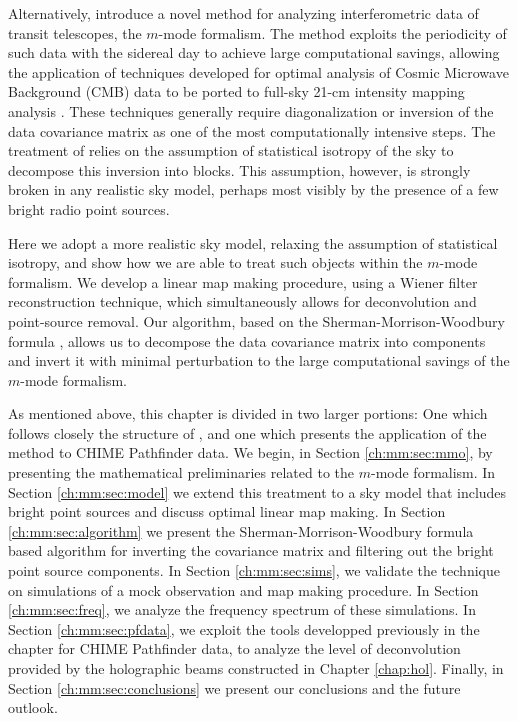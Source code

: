 Alternatively, \cite{mmodes1, mmodes2} introduce a novel method for analyzing interferometric data of transit telescopes, the $m$-mode formalism. The method exploits the periodicity of such data with the sidereal day to achieve large computational savings, allowing the application of techniques developed for optimal analysis of Cosmic Microwave Background (CMB) data \citep{bondjaffeknox, tegmark, myerscbi} to be ported to full-sky 21-cm intensity mapping analysis \citep{liutegmark}. These techniques generally require diagonalization or inversion of the data covariance matrix as one of the most computationally intensive steps. The treatment of \cite{mmodes1, mmodes2} relies on the assumption of statistical isotropy of the sky to decompose this inversion into blocks. This assumption, however, is strongly broken in any realistic sky model, perhaps most visibly by the presence of a few bright radio point sources.

Here we adopt a more realistic sky model, relaxing the assumption of statistical isotropy, and show how we are able to treat such objects within the $m$-mode formalism. We develop a linear map making procedure, using a Wiener filter reconstruction technique, which simultaneously allows for deconvolution and point-source removal. Our algorithm, based on the Sherman-Morrison-Woodbury formula \citep{smf1, smf2, woodbury}, allows us to decompose the data covariance matrix into components and invert it with minimal perturbation to the large computational savings of the $m$-mode formalism.

As mentioned above, this chapter is divided in two larger portions: One which follows closely the structure of \citep{bergeroppermann}, and one which presents the application of the method to CHIME Pathfinder data. We begin, in Section \ref{ch:mm:sec:mmo}, by presenting the mathematical preliminaries related to the $m$-mode formalism. In Section \ref{ch:mm:sec:model} we extend this treatment to a sky model that includes bright point sources and discuss optimal linear map making. In Section \ref{ch:mm:sec:algorithm} we present the Sherman-Morrison-Woodbury formula based algorithm for inverting the covariance matrix and filtering out the bright point source components. In Section \ref{ch:mm:sec:sims}, we validate the technique on simulations of a mock observation and map making procedure. In Section \ref{ch:mm:sec:freq}, we analyze the frequency spectrum of these simulations. In Section \ref{ch:mm:sec:pfdata}, we exploit the tools developped previously in the chapter for CHIME Pathfinder data, to analyze the level of deconvolution provided by the holographic beams constructed in Chapter \ref{chap:hol}. Finally, in Section \ref{ch:mm:sec:conclusions} we present our conclusions and the future outlook.

